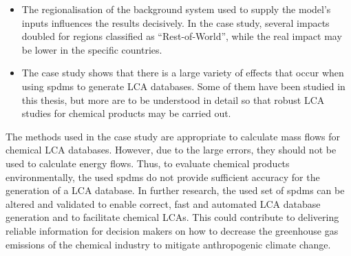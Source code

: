 \begin{itemize}
    \item The regionalisation of the background system used to supply the model's inputs influences the results decisively. In the case study, several impacts doubled for regions classified as ``Rest-of-World'', while the real impact may be lower in the specific countries.
    \item The case study shows that there is a large variety of effects that occur when using \aclp{spdm} to generate \ac{LCA} databases. Some of them have been studied in this thesis, but more are to be understood in detail so that robust LCA studies for chemical products may be carried out.
\end{itemize}

The methods used in the case study are appropriate to calculate mass flows for chemical LCA databases. However, due to the large errors, they should not be used to calculate energy flows. Thus, to evaluate chemical products environmentally, the used \aclp{spdm} do not provide sufficient accuracy for the generation of a LCA database. In further research, the used set of \aclp{spdm} can be altered and validated to enable correct, fast and automated LCA database generation and to facilitate chemical LCAs. This could contribute to delivering reliable information for decision makers on how to decrease the greenhouse gas emissions of the chemical industry to mitigate anthropogenic climate change. 

